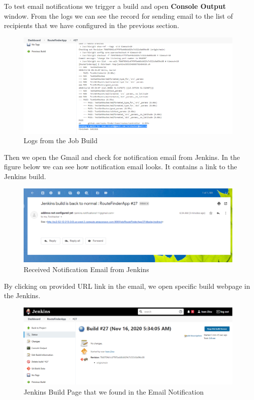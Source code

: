 \documentclass[12pt,a4paper,twoside]{article}
\begin{document}
To test email notifications we trigger a build and open \textbf{Console Output} window. From the logs we can see the record for sending email to the list of recipients that we have configured in the previous section.


\begin{figure}[H]
    \centering
        \includegraphics[width=15cm]{images-aws/57-email-notification-trigger-build.png}
        \caption{Logs from the Job Build}
\end{figure}


Then we open the Gmail and check for notification email from Jenkins. 
In the figure below we can see how notification email looks. It contains a link to the Jenkins build.


\begin{figure}[H]
    \centering
        \includegraphics[width=15cm]{images-aws/58-gmail-notification-received-full.png}
        \caption{Received Notification Email from Jenkins}
\end{figure}


By clicking on provided URL link in the email, we open specific build webpage in the Jenkins.


\begin{figure}[H]
    \centering
        \includegraphics[width=15cm]{images-aws/59-gmail-notification-link-open.png}
        \caption{Jenkins Build Page that we found in the Email Notification}
\end{figure}
\end{document}
